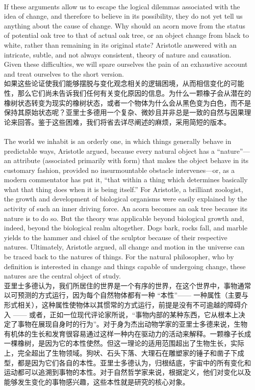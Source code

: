 \documentclass{article}
\begin{document}
\\
If these arguments allow us to escape the logical dilemmas associated with the idea of change, and therefore to believe in its possibility, they do not yet tell us anything about the cause of change. Why should an acorn move from the status of potential oak tree to that of actual oak tree, or an object change from black to white, rather than remaining in its original state? Aristotle answered with an intricate, subtle, and not always consistent, theory of nature and causation. Given these difficulties, we will spare ourselves the pain of an exhaustive account and treat ourselves to the short version.\\
如果这些论证使我们能够摆脱与变化观念相关的逻辑困境，从而相信变化的可能性，那么它们尚未告诉我们任何有关变化原因的信息。为什么一颗橡子会从潜在的橡树状态转变为现实的橡树状态，或者一个物体为什么会从黑色变为白色，而不是保持其原始状态呢？亚里士多德用一个复杂、微妙且并非总是一致的自然与因果理论来回答。鉴于这些困难，我们将省去详尽阐述的麻烦，采用简短的版本。\\

\\
The world we inhabit is an orderly one, in which things generally behave in predictable ways, Aristotle argued, because every natural object has a “nature”—an attribute (associated primarily with form) that makes the object behave in its customary fashion, provided no insurmountable obstacle intervenes—or, as a modern commentator has put it, “that within a thing which determines basically what that thing does when it is being itself.” For Aristotle, a brilliant zoologist, the growth and development of biological organisms were easily explained by the activity of such an inner driving force. An acorn becomes an oak tree because its nature is to do so. But the theory was applicable beyond biological growth and, indeed, beyond the biological realm altogether. Dogs bark, rocks fall, and marble yields to the hammer and chisel of the sculptor because of their respective natures. Ultimately, Aristotle argued, all change and motion in the universe can be traced back to the natures of things. For the natural philosopher, who by definition is interested in change and things capable of undergoing change, these natures are the central object of study.\\
亚里士多德认为，我们所居住的世界是一个有序的世界，在这个世界中，事物通常以可预测的方式运行，因为每个自然物体都有一种 “本性”—— 一种属性（主要与形式相关），这种属性使物体以其惯常的方式运行，前提是没有不可逾越的障碍介入 —— 或者，正如一位现代评论家所说，“事物内部的某种东西，它从根本上决定了事物在展现自身时的行为”。对于身为杰出动物学家的亚里士多德来说，生物有机体的生长和发育很容易通过这样一种内在驱动力的活动来解释。一颗橡子长成一棵橡树，是因为它的本性使然。但这一理论的适用范围超出了生物生长，实际上，完全超出了生物领域。狗吠、石头下落、大理石在雕塑家的锤子和凿子下成型，都是因为它们各自的本性。亚里士多德认为，归根结底，宇宙中的所有变化和运动都可以追溯到事物的本性。对于自然哲学家来说，根据定义，他们对变化以及能够发生变化的事物感兴趣，这些本性就是研究的核心对象。\\
\end{document}
